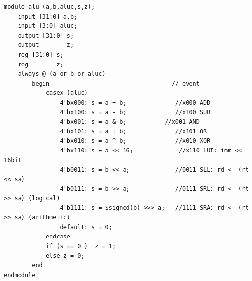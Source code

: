 \documentclass[UTF8]{ctexart}
\begin{document}
\begin{verbatim}
module alu (a,b,aluc,s,z);
    input [31:0] a,b;
    input [3:0] aluc;
    output [31:0] s;
    output        z;
    reg [31:0] s;
    reg        z;
    always @ (a or b or aluc)
        begin                                   // event
            casex (aluc)
                4'bx000: s = a + b;              //x000 ADD
                4'bx100: s = a - b;              //x100 SUB
                4'bx001: s = a & b;			  //x001 AND
                4'bx101: s = a | b;              //x101 OR
                4'bx010: s = a ^ b;              //x010 XOR
                4'bx110: s = a << 16;		      //x110 LUI: imm << 16bit
                4'b0011: s = b << a;             //0011 SLL: rd <- (rt << sa)
                4'b0111: s = b >> a;             //0111 SRL: rd <- (rt >> sa) (logical)
                4'b1111: s = $signed(b) >>> a;   //1111 SRA: rd <- (rt >> sa) (arithmetic)
                default: s = 0;
            endcase
            if (s == 0 )  z = 1;
            else z = 0;
        end
endmodule
\end{verbatim}
\end{document}
